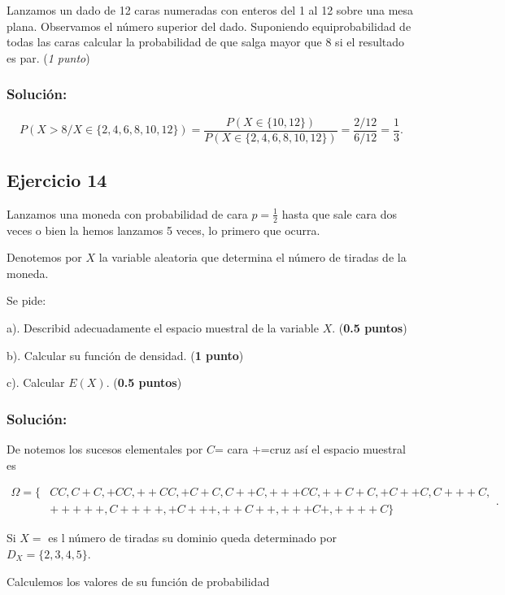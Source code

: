 \documentclass[]{article}
\begin{document}
Lanzamos un dado de 12 caras numeradas con enteros del 1 al 12 sobre una
mesa plana. Observamos el número superior del dado. Suponiendo
equiprobabilidad de todas las caras calcular la probabilidad de que
salga mayor que 8 si el resultado es par. (\emph{1 punto})

\hypertarget{soluciuxf3n-12}{%
\subsubsection{Solución:}\label{soluciuxf3n-12}}

\[ P(X>8/X\in\{2,4,6,8,10,12\})=\frac{P(X\in\{10,12\})}{P(X\in\{2,4,6,8,10,12\})}=\frac{2/12}{6/12}=\frac{1}{3}.\]

\hypertarget{ejercicio-14}{%
\subsection{Ejercicio 14}\label{ejercicio-14}}

Lanzamos una moneda con probabilidad de cara \(p=\frac{1}{2}\) hasta que
sale cara dos veces o bien la hemos lanzamos 5 veces, lo primero que
ocurra.

Denotemos por \(X\) la variable aleatoria que determina el número de
tiradas de la moneda.

Se pide:

a). Describid adecuadamente el espacio muestral de la variable \(X\).
(\textbf{0.5 puntos})

b). Calcular su función de densidad. (\textbf{1 punto})

c). Calcular \(E(X)\). (\textbf{0.5 puntos})

\hypertarget{soluciuxf3n-13}{%
\subsubsection{Solución:}\label{soluciuxf3n-13}}

De notemos los sucesos elementales por \(C\)= cara \(+\)=cruz así el
espacio muestral es

\[\begin{aligned}\Omega=\{&CC,C+C,+CC,++CC,+C+C,C++C,+++CC,++C+C,+C++C,C+++C,\\ & +++++,C++++,+C+++,++C++,+++C+,++++C\}\end{aligned}.\]

Si \(X=\) es l número de tiradas su dominio queda determinado por
\(D_X=\{2,3,4,5\}.\)

Calculemos los valores de su función de probabilidad
\end{document}
